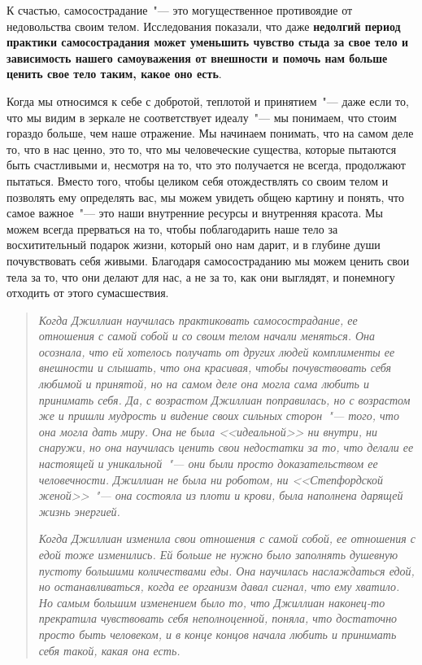 К счастью, самосострадание~"--- это могущественное противоядие от недовольства своим телом. Исследования показали, что даже \textbf{недолгий период практики самосострадания может уменьшить чувство стыда за свое тело и зависимость нашего самоуважения от внешности и помочь нам больше ценить свое тело таким, какое оно есть}. 

Когда мы относимся к себе с добротой, теплотой и принятием~"--- даже если то, что мы видим в зеркале не соответствует идеалу~"--- мы понимаем, что стоим гораздо больше, чем наше отражение. Мы начинаем понимать, что на самом деле то, что в нас ценно, это то, что мы человеческие существа, которые пытаются быть счастливыми и, несмотря на то, что это получается не всегда, продолжают пытаться. Вместо того, чтобы целиком себя отождествлять со своим телом и позволять ему определять вас, мы можем увидеть общею картину и понять, что самое важное~"--- это наши внутренние ресурсы и внутренняя красота. Мы можем всегда прерваться на то, чтобы поблагодарить наше тело за восхитительный подарок жизни, который оно нам дарит, и в глубине души почувствовать себя живыми. Благодаря самосостраданию мы можем ценить свои тела за то, что они делают для нас, а не за то, как они выглядят, и понемногу отходить от этого сумасшествия.  

\begin{quotation}
	\textit{
		Когда Джиллиан научилась практиковать самосострадание, ее отношения с самой собой и со своим телом начали меняться. Она осознала, что ей хотелось получать от других людей комплименты ее внешности и слышать, что она красивая, чтобы почувствовать себя любимой и принятой, но на самом деле она могла сама любить и принимать себя. Да, с возрастом Джиллиан поправилась, но с возрастом же и пришли мудрость и видение своих сильных сторон~"--- того, что она могла дать миру. Она не была <<идеальной>> ни внутри, ни снаружи, но она научилась ценить свои недостатки за то, что делали ее настоящей и уникальной~"--- они были просто доказательством ее человечности. Джиллиан не была ни роботом, ни <<Степфордской женой>>~"--- она состояла из плоти и крови, была наполнена дарящей жизнь энергией.
	}
	
	\textit{
		Когда Джиллиан изменила свои отношения с самой собой, ее отношения с едой тоже изменились. Ей больше не нужно было заполнять душевную пустоту большими количествами еды. Она научилась наслаждаться едой, но останавливаться, когда ее организм давал сигнал, что ему хватило. Но самым большим изменением было то, что Джиллиан наконец-то прекратила чувствовать себя неполноценной, поняла, что достаточно просто быть человеком, и в конце концов начала любить и принимать себя такой, какая она есть.
	}
\end{quotation}

